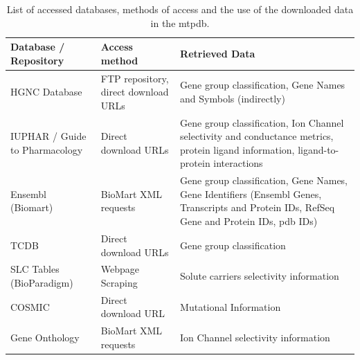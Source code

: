 \begin{table}
\begin{tabularx}{\textwidth}{|X|X|X|}
\hline
\textbf{Database / Repository }         & \textbf{Access method }                       & \textbf{Retrieved Data}                                                                                                                             \\ \hline \hline
HGNC Database                  & FTP repository, direct download URLs & Gene group classification, Gene Names and Symbols (indirectly)                                                                             \\ \hline
IUPHAR / Guide to Pharmacology & Direct download URLs                 & Gene group classification, Ion Channel selectivity and conductance metrics, protein ligand information, ligand-to-protein interactions     \\ \hline
Ensembl (Biomart)              & BioMart XML requests                 & Gene group classification, Gene Names, Gene Identifiers (Ensembl Genes, Transcripts and Protein IDs, RefSeq Gene and Protein IDs, pdb IDs) \\ \hline
TCDB                           & Direct download URLs                 & Gene group classification                                                                                                                  \\ \hline
SLC Tables (BioParadigm)       & Webpage Scraping                     & Solute carriers selectivity information                                                                                                    \\ \hline
COSMIC                         & Direct download URL                  & Mutational Information                                                                                                                    \\ \hline
Gene Onthology                         & BioMart XML requests                  & Ion Channel selectivity information                                                                                                                    \\ \hline
\end{tabularx}

\caption{List of accessed databases, methods of access and the use of the downloaded data in the \acrlong{mtpdb}.}
\label{tab:dataSources}
\end{table}

